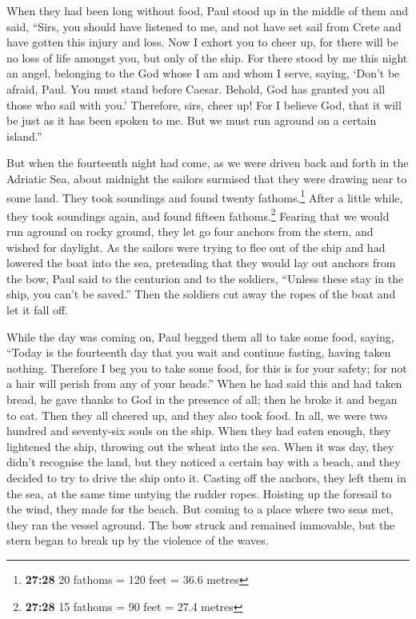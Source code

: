  When they had been long without food, Paul stood up in
the middle of them and said, ``Sirs, you should have listened to me, and
not have set sail from Crete and have gotten this injury and loss.
 Now I exhort you to cheer up, for there will be no loss
of life amongst you, but only of the ship.  For there
stood by me this night an angel, belonging to the God whose I am and
whom I serve,  saying, `Don't be afraid, Paul. You must
stand before Caesar. Behold, God has granted you all those who sail with
you.'  Therefore, sirs, cheer up! For I believe God, that
it will be just as it has been spoken to me.  But we must
run aground on a certain island.''

 But when the fourteenth night had come, as we were
driven back and forth in the Adriatic Sea, about midnight the sailors
surmised that they were drawing near to some land.  They
took soundings and found twenty fathoms.\footnote{\textbf{27:28} 20
  fathoms = 120 feet = 36.6 metres} After a little while, they took
soundings again, and found fifteen fathoms.\footnote{\textbf{27:28} 15
  fathoms = 90 feet = 27.4 metres}  Fearing that we would
run aground on rocky ground, they let go four anchors from the stern,
and wished for daylight.  As the sailors were trying to
flee out of the ship and had lowered the boat into the sea, pretending
that they would lay out anchors from the bow,  Paul said
to the centurion and to the soldiers, ``Unless these stay in the ship,
you can't be saved.''  Then the soldiers cut away the
ropes of the boat and let it fall off.

 While the day was coming on, Paul begged them all to
take some food, saying, ``Today is the fourteenth day that you wait and
continue fasting, having taken nothing.  Therefore I beg
you to take some food, for this is for your safety; for not a hair will
perish from any of your heads.''  When he had said this
and had taken bread, he gave thanks to God in the presence of all; then
he broke it and began to eat.  Then they all cheered up,
and they also took food.  In all, we were two hundred and
seventy-six souls on the ship.  When they had eaten
enough, they lightened the ship, throwing out the wheat into the sea.
 When it was day, they didn't recognise the land, but
they noticed a certain bay with a beach, and they decided to try to
drive the ship onto it.  Casting off the anchors, they
left them in the sea, at the same time untying the rudder ropes.
Hoisting up the foresail to the wind, they made for the beach.
 But coming to a place where two seas met, they ran the
vessel aground. The bow struck and remained immovable, but the stern
began to break up by the violence of the waves.

